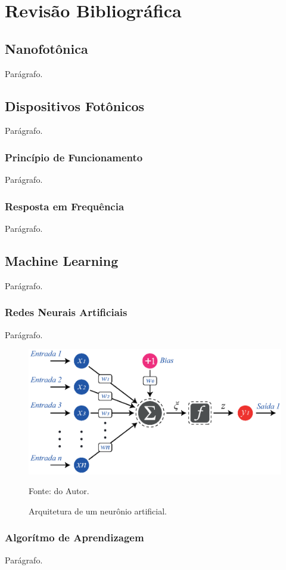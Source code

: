\chapter{Revisão Bibliográfica}



\section{Nanofotônica}

Parágrafo.

\section{Dispositivos Fotônicos}

Parágrafo.

\subsection{Princípio de Funcionamento}

Parágrafo.

\subsection{Resposta em Frequência}

Parágrafo.

\section{Machine Learning}

Parágrafo.

\subsection{Redes Neurais Artificiais}

Parágrafo.


\begin{figure}[H]
    \centering
    \includegraphics{04-Figuras/ArtificialNeuronModel.eps}
    \caption{Arquitetura de um neurônio artificial.} \par
    Fonte: do Autor.
    \label{figura: ArtificialNeuronModel}
\end{figure}




\subsection{Algorítmo de Aprendizagem}

Parágrafo.